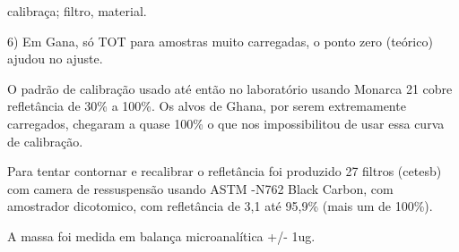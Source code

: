 calibraça; filtro, material.

6) Em Gana, só TOT para amostras muito carregadas, o ponto zero (teórico)
ajudou no ajuste.

O padrão de calibração usado até então no laboratório usando Monarca 21 cobre refletância de 30\% a 100\%. 
Os alvos de Ghana, por serem extremamente carregados, chegaram a quase 100\% o que nos impossibilitou de usar 
essa curva de calibração.  

Para tentar contornar e recalibrar o refletância foi produzido 27 filtros (cetesb) com camera de ressuspensão
usando ASTM -N762 Black Carbon, com amostrador dicotomico, com refletância de 3,1 até 95,9\% (mais um de 100\%).

A massa foi medida em balança microanalítica +/- 1ug.








